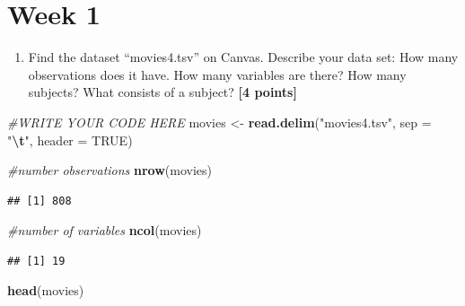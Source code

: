 \documentclass[
]{article}
\newenvironment{Shaded}{\begin{snugshade}}{\end{snugshade}}
\newcommand{\AttributeTok}[1]{\textcolor[rgb]{0.13,0.29,0.53}{#1}}
\newcommand{\CommentTok}[1]{\textcolor[rgb]{0.56,0.35,0.01}{\textit{#1}}}
\newcommand{\ConstantTok}[1]{\textcolor[rgb]{0.56,0.35,0.01}{#1}}
\newcommand{\FunctionTok}[1]{\textcolor[rgb]{0.13,0.29,0.53}{\textbf{#1}}}
\newcommand{\NormalTok}[1]{#1}
\newcommand{\OtherTok}[1]{\textcolor[rgb]{0.56,0.35,0.01}{#1}}
\newcommand{\SpecialCharTok}[1]{\textcolor[rgb]{0.81,0.36,0.00}{\textbf{#1}}}
\newcommand{\StringTok}[1]{\textcolor[rgb]{0.31,0.60,0.02}{#1}}
\providecommand{\tightlist}{%
  \setlength{\itemsep}{0pt}\setlength{\parskip}{0pt}}
\begin{document}
\section{Week 1}\label{week-1}

\begin{enumerate}
\def\labelenumi{\arabic{enumi}.}
\tightlist
\item
  Find the dataset ``movies4.tsv'' on Canvas. Describe your data set:
  How many observations does it have. How many variables are there? How
  many subjects? What consists of a subject? \textbf{[4 points]}
\end{enumerate}

\begin{Shaded}
\begin{Highlighting}[]
\CommentTok{\#WRITE YOUR CODE HERE}
\NormalTok{movies }\OtherTok{\textless{}{-}} \FunctionTok{read.delim}\NormalTok{(}\StringTok{"movies4.tsv"}\NormalTok{, }\AttributeTok{sep =} \StringTok{"}\SpecialCharTok{\textbackslash{}t}\StringTok{"}\NormalTok{, }\AttributeTok{header =} \ConstantTok{TRUE}\NormalTok{)}

\CommentTok{\#number observations}
\FunctionTok{nrow}\NormalTok{(movies)}
\end{Highlighting}
\end{Shaded}

\begin{verbatim}
## [1] 808
\end{verbatim}

\begin{Shaded}
\begin{Highlighting}[]
\CommentTok{\#number of variables }
\FunctionTok{ncol}\NormalTok{(movies)}
\end{Highlighting}
\end{Shaded}

\begin{verbatim}
## [1] 19
\end{verbatim}

\begin{Shaded}
\begin{Highlighting}[]
\FunctionTok{head}\NormalTok{(movies)}
\end{Highlighting}
\end{Shaded}
\end{document}
